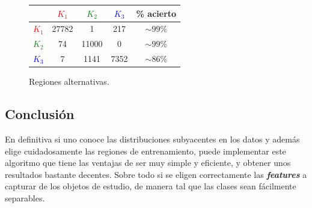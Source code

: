 \begin{itemize}
\begin{figure}[H]
   \begin{minipage}{0.49\textwidth}
      \caption{Regiones alternativas.}
   \end{minipage}
   \begin{minipage}{0.49\textwidth}
   \begin{center}
      \begin{tabular}{c|c|c|c|c|}
		\cline{2-5}
 & \textcolor{red}{$K_{1}$} & \textcolor{green}{$K_{2}$} & \textcolor{blue}{$K_{3}$} & \% acierto \\
		\hline
		\multicolumn{1}{|c|}{\textcolor{red}{$K_{1}$}} & 27782 & 1 & 217 & $ \sim 99\%$ \\
		\multicolumn{1}{|c|}{\textcolor{green}{$K_{2}$}} & 74  & 11000 & 0 & $\sim 99\%$  \\
		\multicolumn{1}{|c|}{\textcolor{blue}{$K_{3}$}} & 7   & 1141  & 7352 & $\sim 86\%$ \\
		\hline
		\end{tabular}
		\end{center}
   \end{minipage}
\end{figure}



\end{itemize}
\subsection{Conclusión}
En definitiva si uno conoce las distribuciones subyacentes en los datos y además elige cuidadosamente las regiones de entrenamiento, puede implementar este algoritmo que tiene las ventajas de ser muy simple y eficiente, y obtener unos resultados bastante decentes. Sobre todo si se eligen correctamente las \textit{\textbf{features}} a capturar de los objetos de estudio, de manera tal que las clases sean fácilmente separables.

